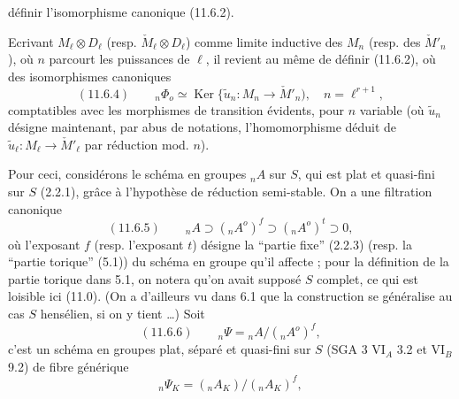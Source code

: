 
définir l'isomorphisme canonique (11.6.2).

Ecrivant $M_\ell\otimes D_\ell$ (resp. $\check M_\ell\otimes D_\ell$) comme limite inductive des $M_n$ (resp. des $\check M'_n$), où $n$ parcourt les puissances de $\ell$, il revient au même de définir (11.6.2), où des isomorphismes canoniques
\[
(11.6.4)\qquad {}_n\Phi_o\simeq\operatorname{Ker}
\{\widetilde u_n:M_n\longrightarrow\check M'_n),\quad n=\ell^{r+1},
\]
comptatibles avec les morphismes de transition évidents, pour $n$ variable
(où $\widetilde u_n$ désigne maintenant, par abus de notations, l'homomorphisme déduit de $\widetilde u_\ell:M_\ell\longrightarrow\check M'_\ell$ par réduction mod. $n$).

Pour ceci, considérons le schéma en groupes $ {}_n A$ sur $S$, qui est plat et quasi-fini sur $S$ (2.2.1), grâce à l'hypothèse de réduction semi-stable. On a une filtration canonique
\[
(11.6.5)\qquad {}_n A\supset({}_n A^o)^f\supset({}_n A^o)^t\supset0,
\]
où l'exposant $f$ (resp. l'exposant $t$) désigne la ``partie fixe'' (2.2.3) (resp. la ``partie torique'' (5.1)) du schéma en groupe qu'il affecte ; pour la définition de la partie torique dans 5.1, on notera qu'on avait supposé $S$ complet, ce qui est loisible ici (11.0). (On a d'ailleurs vu dans 6.1 que la construction se généralise au cas $S$ hensélien, si on y tient \ldots) Soit
\[
(11.6.6)\qquad {}_n\Psi={}_n A/({}_n A^o)^f,
\]
c'est un schéma en groupes plat, séparé et quasi-fini sur $S$ (SGA 3 $\mathrm{VI}_A$ 3.2 et $\mathrm{VI}_B$ 9.2) de fibre générique
\[
{}_n\Psi_K=({}_n A_K)/({}_n A_K)^f,
\]


